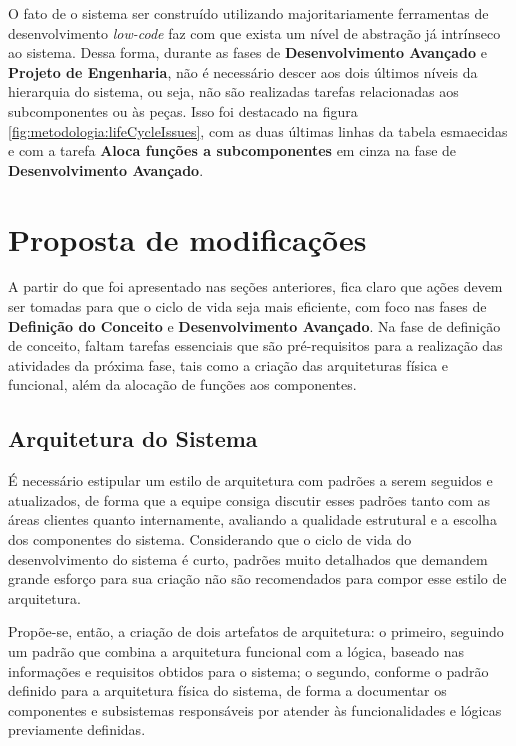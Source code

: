 	O fato de o sistema ser construído utilizando majoritariamente ferramentas de desenvolvimento \textit{low-code} faz com que exista um nível de abstração já intrínseco ao sistema. Dessa forma, durante as fases de \textbf{Desenvolvimento Avançado} e \textbf{Projeto de Engenharia}, não é necessário descer aos dois últimos níveis da hierarquia do sistema, ou seja, não são realizadas tarefas relacionadas aos subcomponentes ou às peças. Isso foi destacado na figura \ref{fig:metodologia:lifeCycleIssues}, com as duas últimas linhas da tabela esmaecidas e com a tarefa \textbf{Aloca funções a subcomponentes} em cinza na fase de \textbf{Desenvolvimento Avançado}.

	\section{Proposta de modificações}

	A partir do que foi apresentado nas seções anteriores, fica claro que ações devem ser tomadas para que o ciclo de vida seja mais eficiente, com foco nas fases de \textbf{Definição do Conceito} e \textbf{Desenvolvimento Avançado}. Na fase de definição de conceito, faltam tarefas essenciais que são pré-requisitos para a realização das atividades da próxima fase, tais como a criação das arquiteturas física e funcional, além da alocação de funções aos componentes.

	\subsection{Arquitetura do Sistema}

	É necessário estipular um estilo de arquitetura com padrões a serem seguidos e atualizados, de forma que a equipe consiga discutir esses padrões tanto com as áreas clientes quanto internamente, avaliando a qualidade estrutural e a escolha dos componentes do sistema. Considerando que o ciclo de vida do desenvolvimento do sistema é curto, padrões muito detalhados que demandem grande esforço para sua criação não são recomendados para compor esse estilo de arquitetura.

	Propõe-se, então, a criação de dois artefatos de arquitetura: o primeiro, seguindo um padrão que combina a arquitetura funcional com a lógica, baseado nas informações e requisitos obtidos para o sistema; o segundo, conforme o padrão definido para a arquitetura física do sistema, de forma a documentar os componentes e subsistemas responsáveis por atender às funcionalidades e lógicas previamente definidas.

